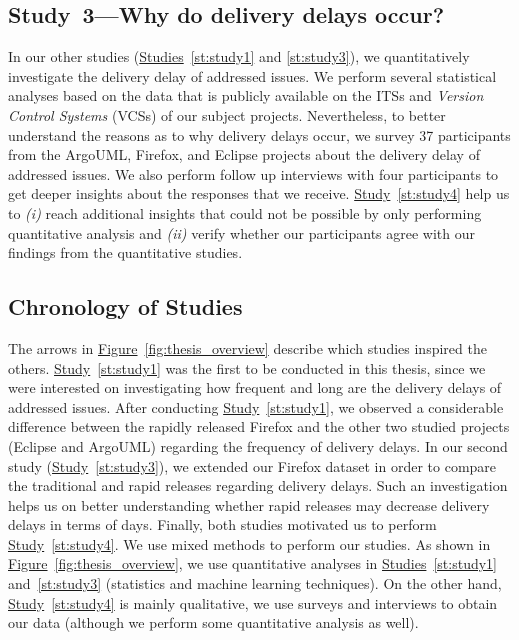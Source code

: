 \subsection{Study~3---Why do delivery delays occur?}

 In our other studies
(\hyperref[st:study1]{Studies}~\ref{st:study1} and \ref{st:study3}), we
quantitatively investigate the delivery delay of addressed issues. We perform
several statistical analyses based on the data that is publicly available on the
ITSs and {\em Version Control Systems} (VCSs) of our subject projects. Nevertheless, to better understand the
reasons as to why delivery delays occur, we survey 37 participants from the
ArgoUML, Firefox, and Eclipse projects about the delivery delay of addressed
issues. We also perform follow up interviews with four participants to get
deeper insights about the responses that we receive.
\hyperref[st:study4]{Study}~\ref{st:study4} help us to {\em (i)} reach
additional insights that could not be possible by only performing quantitative
analysis and {\em (ii)} verify whether our participants agree with our
findings from the quantitative studies. 

\subsection{Chronology of Studies}

The arrows in \hyperref[fig:thesis_overview]{Figure}~\ref{fig:thesis_overview}
describe which studies inspired the others.
\hyperref[st:study1]{Study}~\ref{st:study1} was the first to be conducted in
this thesis, since we were interested on investigating how frequent and long are
the delivery delays of addressed issues. After conducting
\hyperref[st:study1]{Study}~\ref{st:study1}, we observed a considerable
difference between the rapidly released Firefox and the other two studied
projects (\ie Eclipse and ArgoUML) regarding the frequency of delivery delays.
In our second study (\hyperref[st:study3]{Study}~\ref{st:study3}), we extended
our Firefox dataset in order to compare the traditional and rapid releases
regarding delivery delays. Such an investigation helps us on better
understanding whether rapid releases may decrease delivery delays in terms of
days. Finally, both studies motivated us to perform
\hyperref[st:study4]{Study}~\ref{st:study4}. We use mixed methods to perform our
studies. As shown in
\hyperref[fig:thesis_overview]{Figure}~\ref{fig:thesis_overview}, we use
quantitative analyses in \hyperref[st:study1]{Studies}~\ref{st:study1}
and~\ref{st:study3} (\ie statistics and machine learning techniques). On the
other hand, \hyperref[st:study4]{Study}~\ref{st:study4} is mainly qualitative,
\ie we use surveys and interviews to obtain our data (although we perform some
quantitative analysis as well).

